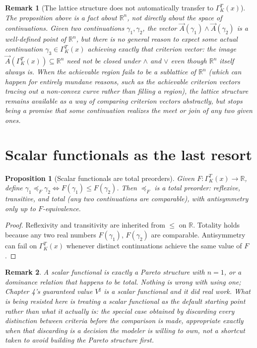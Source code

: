 \documentclass[11pt]{report}
\newtheorem{proposition}{Proposition}[chapter]
\newtheorem{remark}{Remark}[chapter]
\begin{document}
\begin{remark}[The lattice structure does not automatically transfer to $\Gamma_K^T(x)$]
The proposition above is a fact about $\mathbb{R}^n$, not directly
about the space of continuations. Given two continuations $\gamma_1,
\gamma_2$, the vector $\vec A(\gamma_1) \wedge \vec A(\gamma_2)$ is a
well-defined point of $\mathbb{R}^n$, but there is no general reason to
expect some actual continuation $\gamma_3 \in \Gamma_K^T(x)$ achieving
exactly that criterion vector: the image
$\vec A(\Gamma_K^T(x)) \subseteq \mathbb{R}^n$ need not be closed under
$\wedge$ and $\vee$ even though $\mathbb{R}^n$ itself always is. When
the achievable region fails to be a sublattice of $\mathbb{R}^n$
(which can happen for entirely mundane reasons, such as the achievable
criterion vectors tracing out a non-convex curve rather than filling a
region), the lattice structure remains available as a way of
comparing criterion vectors abstractly, but stops being a promise that
some continuation realizes the meet or join of any two given ones.
\end{remark}

\section*{Scalar functionals as the last resort}

\begin{proposition}[Scalar functionals are total preorders]
Given $F : \Gamma_K^T(x) \to \mathbb{R}$, define $\gamma_1 \preceq_F
\gamma_2 \iff F(\gamma_1) \leq F(\gamma_2)$. Then $\preceq_F$ is a
total preorder: reflexive, transitive, and total (any two
continuations are comparable), with antisymmetry only up to
$F$-equivalence.
\end{proposition}
\begin{proof}
Reflexivity and transitivity are inherited from $\leq$ on $\mathbb{R}$.
Totality holds because any two real numbers $F(\gamma_1)$,
$F(\gamma_2)$ are comparable. Antisymmetry can fail on
$\Gamma_K^T(x)$ whenever distinct continuations achieve the same value
of $F$.
\end{proof}

\begin{remark}
A scalar functional is exactly a Pareto structure with $n=1$, or a
dominance relation that happens to be total. Nothing is wrong with
using one; Chapter 4's guaranteed value $V^\sharp$ is a scalar
functional and it did real work. What is being resisted here is
treating a scalar functional as the default starting point rather than
what it actually is: the special case obtained by discarding every
distinction between criteria before the comparison is made, appropriate
exactly when that discarding is a decision the modeler is willing to
own, not a shortcut taken to avoid building the Pareto structure first.
\end{remark}
\end{document}
